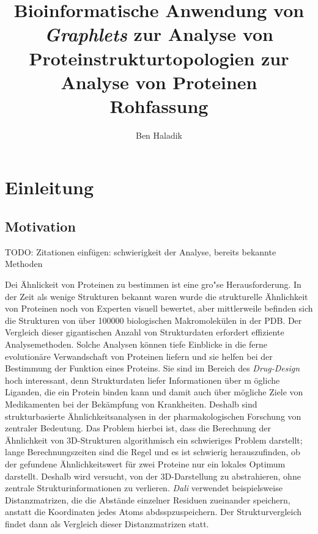 \documentclass{report}
\author{Ben Haladik}
\title{Bioinformatische Anwendung von \textit{Graphlets} zur Analyse von Proteinstrukturtopologien zur Analyse von Proteinen \\ Rohfassung}
\begin{document}


\maketitle

\newpage

\tableofcontents

\newpage

\chapter{Einleitung}

\section{Motivation}

TODO: Zitationen einf\"ugen: schwierigkeit der Analyse, bereits bekannte Methoden

Dei \"Ahnlickeit von Proteinen zu bestimmen ist eine gro"se Herausforderung. In der Zeit als wenige Strukturen bekannt waren wurde die strukturelle \"Ahnlichkeit von Proteinen noch von Experten visuell bewertet, aber mittlerweile befinden sich die Strukturen von \"uber 100000 biologischen Makromolek\"ulen in der PDB. Der Vergleich dieser gigantischen Anzahl von Strukturdaten erfordert effiziente Analysemethoden. Solche Analysen k\"onnen tiefe Einblicke in die ferne evolution\"are Verwandschaft von Proteinen liefern und sie helfen bei der Bestimmung der Funktion eines Proteins. Sie sind im Bereich des \textit{Drug-Design} hoch interessant, denn  Strukturdaten liefer Informationen \"uber m \"ogliche Liganden, die ein Protein binden kann und damit auch \"uber m\"ogliche Ziele von Medikamenten bei der Bek\"ampfung von Krankheiten. Deshalb sind strukturbasierte \"Ahnlichkeitsanalysen in der pharmakologischen Forschung von zentraler Bedeutung.
Das Problem hierbei ist, dass die Berechnung der \"Ahnlichkeit von 3D-Strukturen algorithmisch ein schwieriges Problem darstellt; lange Berechnungszeiten sind die Regel und es ist schwierig herauszufinden, ob der gefundene \"Ahnlichkeitswert f\"ur zwei Proteine nur ein lokales Optimum darstellt.
Deshalb wird versucht, von der 3D-Darstellung zu abstrahieren, ohne zentrale Strukturinformationen zu verlieren. \emph{Dali} \cite{dali}verwendet beispielsweise Distanzmatrizen, die die Abst\"ande einzelner Residuen zueinander speichern, anstatt die Koordinaten jedes Atoms abdsspzuspeichern.
Der Strukturvergleich findet dann als Vergleich dieser Distanzmatrizen statt.
\end{document}
